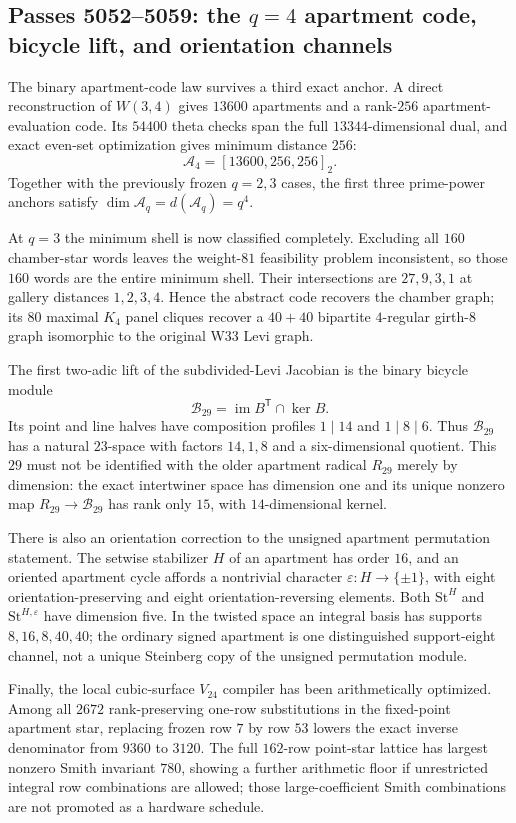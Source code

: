 \subsection*{Passes 5052--5059: the $q=4$ apartment code, bicycle lift, and orientation channels}
The binary apartment-code law survives a third exact anchor.  A direct reconstruction of $W(3,4)$ gives $13600$ apartments and a rank-$256$ apartment-evaluation code.  Its $54400$ theta checks span the full $13344$-dimensional dual, and exact even-set optimization gives minimum distance $256$:
\[
\mathcal A_4=[13600,256,256]_2.
\]
Together with the previously frozen $q=2,3$ cases, the first three prime-power anchors satisfy $\dim\mathcal A_q=d(\mathcal A_q)=q^4$.

At $q=3$ the minimum shell is now classified completely.  Excluding all $160$ chamber-star words leaves the weight-$81$ feasibility problem inconsistent, so those $160$ words are the entire minimum shell.  Their intersections are $27,9,3,1$ at gallery distances $1,2,3,4$.  Hence the abstract code recovers the chamber graph; its $80$ maximal $K_4$ panel cliques recover a $40+40$ bipartite $4$-regular girth-$8$ graph isomorphic to the original W33 Levi graph.

The first two-adic lift of the subdivided-Levi Jacobian is the binary bicycle module
\[
\mathcal B_{29}=\operatorname{im}B^{\mathsf T}\cap\ker B.
\]
Its point and line halves have composition profiles $1\mid14$ and $1\mid8\mid6$.  Thus $\mathcal B_{29}$ has a natural $23$-space with factors $14,1,8$ and a six-dimensional quotient.  This $29$ must not be identified with the older apartment radical $R_{29}$ merely by dimension: the exact intertwiner space has dimension one and its unique nonzero map $R_{29}\to\mathcal B_{29}$ has rank only $15$, with $14$-dimensional kernel.

There is also an orientation correction to the unsigned apartment permutation statement.  The setwise stabilizer $H$ of an apartment has order $16$, and an oriented apartment cycle affords a nontrivial character $\varepsilon:H\to\{\pm1\}$, with eight orientation-preserving and eight orientation-reversing elements.  Both $\mathrm{St}^{H}$ and $\mathrm{St}^{H,\varepsilon}$ have dimension five.  In the twisted space an integral basis has supports $8,16,8,40,40$; the ordinary signed apartment is one distinguished support-eight channel, not a unique Steinberg copy of the unsigned permutation module.

Finally, the local cubic-surface $V_{24}$ compiler has been arithmetically optimized.  Among all $2672$ rank-preserving one-row substitutions in the fixed-point apartment star, replacing frozen row $7$ by row $53$ lowers the exact inverse denominator from $9360$ to $3120$.  The full $162$-row point-star lattice has largest nonzero Smith invariant $780$, showing a further arithmetic floor if unrestricted integral row combinations are allowed; those large-coefficient Smith combinations are not promoted as a hardware schedule.

